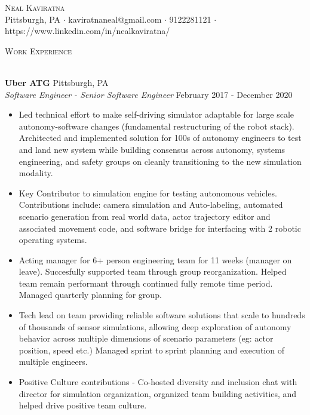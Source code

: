 \documentclass[a4paper]{article}
\newcommand{\lineunder} {
    \vspace*{-8pt} \\
    \hspace*{-18pt} \hrulefill \\
}
\newcommand{\header} [1] {
    {\hspace*{-18pt}\vspace*{6pt} \textsc{#1}}
    \vspace*{-6pt} \lineunder
}
\begin{document}
\vspace*{-40pt}

    

\vspace*{-10pt}
\begin{center}
	{\Huge \scshape {Neal Kaviratna}}\\
	Pittsburgh, PA $\cdot$ kaviratnaneal@gmail.com $\cdot$ 9122281121 $\cdot$ https://www.linkedin.com/in/nealkaviratna/\\
\end{center}

\header{Work Experience}
\vspace{1mm}

\textbf{Uber ATG} \hfill Pittsburgh, PA\\
\textit{Software Engineer - Senior Software Engineer} \hfill February 2017 - December 2020\\
\vspace{-1mm}
\begin{itemize} \itemsep 1pt
	\item Led technical effort to make self-driving simulator adaptable for large scale autonomy-software changes (fundamental restructuring of the robot stack). Architected and implemented solution for 100s of autonomy engineers to test and land new system while building consensus across autonomy, systems engineering, and safety groups on cleanly transitioning to the new simulation modality.
	\item Key Contributor to simulation engine for testing autonomous vehicles. Contributions include: camera simulation and Auto-labeling, automated scenario generation from real world data, actor trajectory editor and associated movement code, and software bridge for interfacing with 2 robotic operating systems.
	\item Acting manager for 6+ person engineering team for 11 weeks (manager on leave). Succesfully supported team through group reorganization. Helped team remain performant through continued fully remote time period. Managed quarterly planning for group.
	\item Tech lead on team providing reliable software solutions that scale to hundreds of thousands of sensor simulations, allowing deep exploration of autonomy behavior across multiple dimensions of scenario parameters (eg: actor position, speed etc.) Managed sprint to sprint planning and execution of multiple engineers.
	\item Positive Culture contributions - Co-hosted diversity and inclusion chat with director for simulation organization, organized team building activities, and helped drive positive team culture.
\end{itemize}
\end{document}
